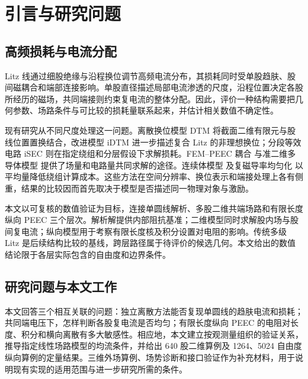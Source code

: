 \section{引言与研究问题}
\label{chapter:01}

\hypertarget{01.introduction.heading}{}
\subsection{高频损耗与电流分配}

\hypertarget{01.introduction.p1}{}
Litz 线通过细股绝缘与沿程换位调节高频电流分布，其损耗同时受单股趋肤、股间磁耦合和端部连接影响。单股直径描述局部电流渗透的尺度，沿程位置决定各股所经历的磁场，共同端接则约束复电流的整体分配。因此，评价一种结构需要把几何参数、场路条件与可比较的损耗量联系起来，并估计相关数值不确定性。

\hypertarget{01.introduction.p2}{}
现有研究从不同尺度处理这一问题。离散换位模型 DTM \cite{P01} 将截面二维有限元与股线位置置换结合，改进模型 iDTM \cite{N01} 进一步描述复合 Litz 的非理想换位；分段等效电路 iSEC \cite{P02} 则在指定绕组和分层假设下求解损耗。FEM–PEEC 耦合 \cite{P03} 与准二维多导体模型 \cite{P04} 提供了场量和电路量共同求解的途径。连续体模型 \cite{P05} 及复磁导率均匀化 \cite{P09} 以平均量降低绕组计算成本。这些方法在空间分辨率、换位表示和端接处理上各有侧重，结果的比较因而首先取决于模型是否描述同一物理对象与激励。

\hypertarget{01.introduction.p3}{}
本文以可复核的数值验证为目标，连接单圆线解析、多股二维共端场路和有限长度纵向 PEEC 三个层次。解析解提供内部阻抗基准；二维模型同时求解股内场与股间复电流；纵向模型用于考察有限长度核及积分设置对电阻的影响。传统多级 Litz 是后续结构比较的基线，跨层路径属于待评价的候选几何。本文给出的数值结论限于各层实际包含的自由度和边界条件。

\hypertarget{01.scope.heading}{}
\subsection{研究问题与本文工作}

\hypertarget{01.scope.p1}{}
本文回答三个相互关联的问题：独立离散方法能否复现单圆线的趋肤电流和损耗；共同端电压下，怎样判断各股复电流是否均匀；有限长度纵向 PEEC 的电阻对长度、积分和横向离散有多大敏感性。相应地，本文建立按观测量组织的验证关系，推导指定线性场路模型的均流条件，并给出 640 股二维算例及 1264、5024 自由度纵向算例的定量结果。三维外场算例、场势诊断和接口验证作为补充材料，用于说明现有实现的适用范围与进一步研究所需的条件。

